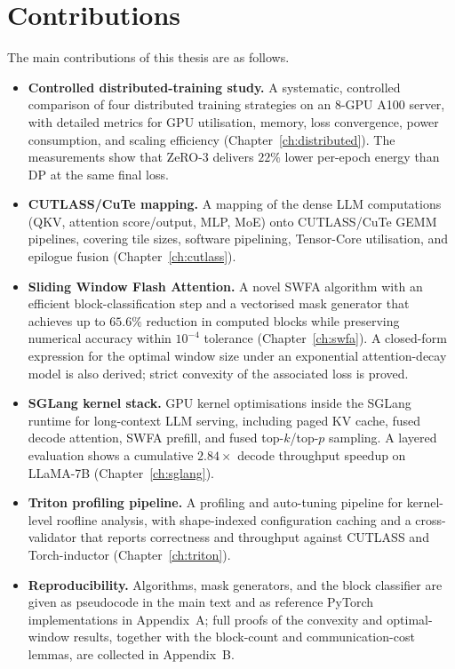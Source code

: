 \section{Contributions}\label{sec:intro_contributions}
The main contributions of this thesis are as follows.
\begin{itemize}
    \item \textbf{Controlled distributed-training study.} A systematic,
          controlled comparison of four distributed training strategies
          on an 8-GPU A100 server, with detailed metrics for GPU
          utilisation, memory, loss convergence, power consumption, and
          scaling efficiency (Chapter~\ref{ch:distributed}). The
          measurements show that ZeRO-3 delivers $22\%$ lower per-epoch
          energy than DP at the same final loss.
    \item \textbf{CUTLASS/CuTe mapping.} A mapping of the dense LLM
          computations (QKV, attention score/output, MLP, MoE) onto
          CUTLASS/CuTe GEMM pipelines, covering tile sizes, software
          pipelining, Tensor-Core utilisation, and epilogue fusion
          (Chapter~\ref{ch:cutlass}).
    \item \textbf{Sliding Window Flash Attention.} A novel SWFA algorithm
          with an efficient block-classification step and a vectorised
          mask generator that achieves up to $65.6\%$ reduction in
          computed blocks while preserving numerical accuracy within
          $10^{-4}$ tolerance (Chapter~\ref{ch:swfa}). A closed-form
          expression for the optimal window size under an exponential
          attention-decay model is also derived; strict convexity of the
          associated loss is proved.
    \item \textbf{SGLang kernel stack.} GPU kernel optimisations inside
          the SGLang runtime for long-context LLM serving, including
          paged KV cache, fused decode attention, SWFA prefill, and fused
          top-$k$/top-$p$ sampling. A layered evaluation shows a
          cumulative $2.84\times$ decode throughput speedup on LLaMA-7B
          (Chapter~\ref{ch:sglang}).
    \item \textbf{Triton profiling pipeline.} A profiling and auto-tuning
          pipeline for kernel-level roofline analysis, with shape-indexed
          configuration caching and a cross-validator that reports
          correctness and throughput against CUTLASS and Torch-inductor
          (Chapter~\ref{ch:triton}).
    \item \textbf{Reproducibility.} Algorithms, mask generators, and the
          block classifier are given as pseudocode in the main text and
          as reference PyTorch implementations in Appendix~A; full proofs
          of the convexity and optimal-window results, together with the
          block-count and communication-cost lemmas, are collected in
          Appendix~B.
\end{itemize}

